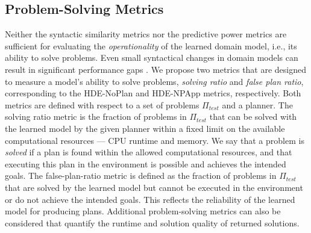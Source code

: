 \documentclass[letterpaper]{article} %
\newcommand{\ptest}{\ensuremath{\Pi_{\textit{test}}}\xspace}
\newif\ifaddcomments
\newcommand{\roni}[1]{\ifaddcomments{\textcolor{red}{[Roni: #1]}}\fi}
\newcommand{\mauro}[1]{\ifaddcomments{\textcolor{green}{[Mauro: #1]}}\fi}
\newcommand{\leo}[1]{\ifaddcomments{\textcolor{pink}{[Leonardo: #1]}}\fi}
\begin{document}
\subsection{Problem-Solving Metrics}
Neither the syntactic similarity metrics nor the predictive power metrics are sufficient for evaluating the \emph{operationality} \citep{DBLP:conf/kcap/McCluskeyVV17} of the learned domain model, i.e., its ability to solve problems. Even small syntactical changes in domain models can result in significant performance gaps \citep{DBLP:conf/kcap/VallatiC19,vallati2021importance}. 
We propose two metrics that are designed to measure a model's ability to solve problems, \emph{solving ratio} and \emph{false plan ratio}, corresponding to the HDE-NoPlan and HDE-NPApp metrics, respectively. \roni{Added in the last sentence a connection to the HDE metrics}
Both metrics are defined with respect to a set of problems \ptest and a planner. 
The solving ratio metric is the fraction of problems in \ptest that can be solved with the learned model by the given planner within a fixed limit on the available computational resources --- CPU runtime and memory.
We say that a problem is \emph{solved} if a plan is found within the allowed computational resources, and that executing this plan in the environment is possible and achieves the intended goals.
The false-plan-ratio metric is defined as the fraction of problems in \ptest that are solved by the learned model but cannot be executed in the environment or do not achieve the intended goals. 
This reflects the reliability of the learned model for producing plans. 
Additional problem-solving metrics can also be considered that quantify the runtime and solution quality of returned solutions. 
\end{document}
